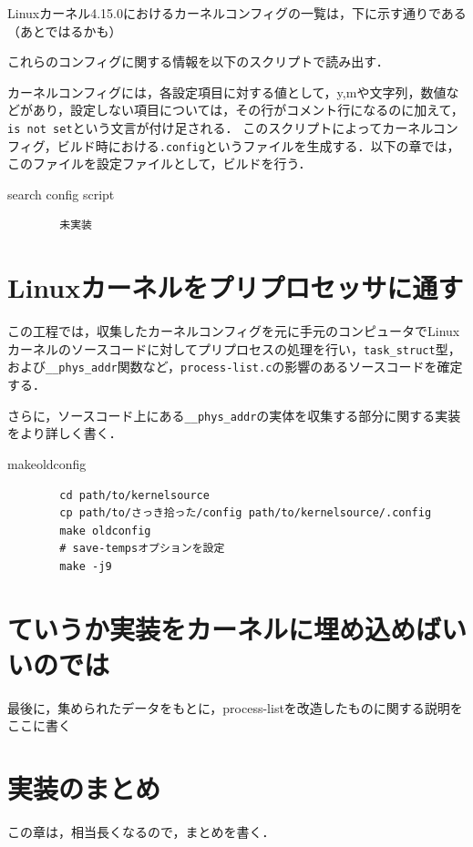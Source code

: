 Linuxカーネル4.15.0におけるカーネルコンフィグの一覧は，下に示す通りである（あとではるかも）

これらのコンフィグに関する情報を以下のスクリプトで読み出す．

カーネルコンフィグには，各設定項目に対する値として，y,mや文字列，数値などがあり，設定しない項目については，その行がコメント行になるのに加えて，\verb|is not set|という文言が付け足される．
このスクリプトによってカーネルコンフィグ，ビルド時における\verb|.config|というファイルを生成する．以下の章では，このファイルを設定ファイルとして，ビルドを行う．

\begin{itembox}[l]{search config script}
    \begin{verbatim}
        未実装
    \end{verbatim}
\end{itembox}

\section{Linuxカーネルをプリプロセッサに通す}

この工程では，収集したカーネルコンフィグを元に手元のコンピュータでLinuxカーネルのソースコードに対してプリプロセスの処理を行い，\verb|task_struct|型，
および\verb|__phys_addr|関数など，\verb|process-list.c|の影響のあるソースコードを確定する．

さらに，ソースコード上にある\verb|__phys_addr|の実体を収集する部分に関する実装をより詳しく書く．

\begin{itembox}[l]{makeoldconfig}
    \begin{verbatim}
        cd path/to/kernelsource
        cp path/to/さっき拾った/config path/to/kernelsource/.config
        make oldconfig
        # save-tempsオプションを設定
        make -j9
    \end{verbatim}
\end{itembox}

\section{ていうか実装をカーネルに埋め込めばいいのでは}

最後に，集められたデータをもとに，process-listを改造したものに関する説明をここに書く

\section{実装のまとめ}

この章は，相当長くなるので，まとめを書く．
